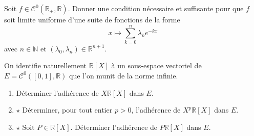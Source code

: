 \documentclass[french,a4paper]{article}
\newcommand{\N}{\mathbb{N}}
\newcommand{\R}{\mathbb{R}}
\theoremstyle{plain}
\theoremstyle{definition}
\theoremstyle{remark}
\begin{document}
\begin{ex}{}
	Soit $f\in\mathcal{C}^0(\R_+,\R)$. Donner une condition nécessaire et suffisante pour que $f$ soit limite uniforme d'une suite de fonctions de la forme $$x\mapsto\sum_{k=0}^{n}\lambda_ke^{-kx}$$ avec $n\in\N$ et $(\lambda_0,\lambda_n)\in\R^{n+1}$.
\end{ex}

\begin{ex}{}
	On identifie naturellement $\R[X]$ à un sous-espace vectoriel de $E=\mathcal{C}^0([0,1],\R)$ que l'on munit de la norme infinie.
	\begin{enumerate}
		\item Déterminer l'adhérence de $X\R[X]$ dans $E$.
		\item $\star$ Déterminer, pour tout entier $p>0$, l'adhérence de $X^p\R[X]$ dans $E$.
		\item $\star$ Soit $P\in\R[X]$. Déterminer l'adhérence de $P\R[X]$ dans $E$.
	\end{enumerate}
\end{ex}
\end{document}
